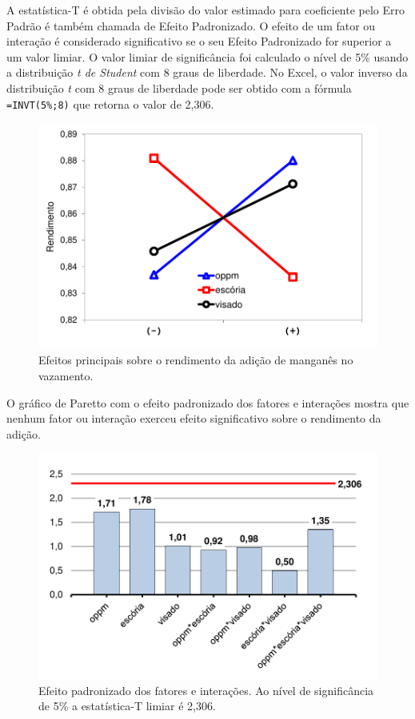 		A estatística-T é obtida pela divisão do valor estimado para coeficiente pelo Erro Padrão é também chamada de Efeito Padronizado. O efeito de um fator ou interação é considerado significativo se o seu Efeito Padronizado for superior a um valor limiar. O valor limiar de significância foi calculado o nível de 5\% usando a distribuição \textit{t de Student} com 8 graus de liberdade. No Excel, o valor inverso da distribuição \textit{t} com 8 graus de liberdade pode ser obtido com a  fórmula {\small \texttt{=INVT(5\%;8)}} que retorna o valor de 2,306. 
		\begin{figure}[H]
			\centering
			\includegraphics[scale=0.55, bb=0 0 432 288, trim=0in 0in 0in 0in]{figures/fig05-excel.pdf} %
			\caption{Efeitos principais sobre o rendimento da adição de manganês no vazamento.}
			\label{fig:main}
		\end{figure}		
		O gráfico de Paretto com o efeito padronizado dos fatores e interações mostra que nenhum fator ou interação exerceu efeito significativo sobre o rendimento da adição. 
		\begin{figure}[H]
			\centering
			\includegraphics[scale=0.55, bb=0 0 432 288, trim=0in 0in 0in 0in]{figures/fig07-excel.pdf} %
			\caption{Efeito padronizado dos fatores e interações. Ao nível de significância de 5\% a estatística-T limiar é 2,306.}
			\label{fig:pareto}
		\end{figure}		
